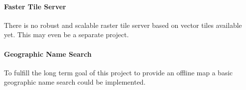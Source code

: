 \paragraph{Faster Tile Server}
There is no robust and scalable raster tile server based on vector tiles available yet.
This may even be a separate project.

\paragraph{Geographic Name Search}

To fulfill the long term goal of this project to provide an offline map a basic geographic name search could be implemented.

\newpage{}